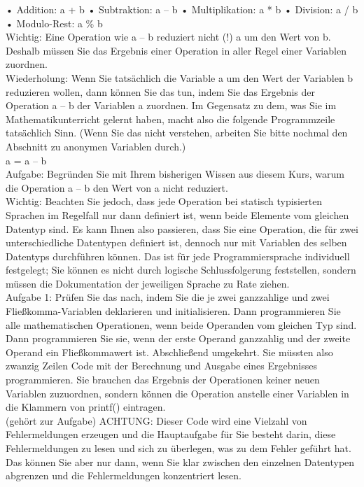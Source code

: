 •	Addition: 	a + b
•	Subtraktion:	a – b
•	Multiplikation:	a * b
•	Division:	a / b
•	Modulo-Rest:	a \% b\\

Wichtig: Eine Operation wie a – b reduziert nicht (!) a um den Wert von b. Deshalb müssen Sie das Ergebnis einer Operation in aller Regel einer Variablen zuordnen. \\

Wiederholung: Wenn Sie tatsächlich die Variable a um den Wert der Variablen b reduzieren wollen, dann können Sie das tun, indem Sie das Ergebnis der Operation a – b der Variablen a zuordnen. Im Gegensatz zu dem, was Sie im Mathematikunterricht gelernt haben, macht also die folgende Programmzeile tatsächlich Sinn. (Wenn Sie das nicht verstehen, arbeiten Sie bitte nochmal den Abschnitt zu anonymen Variablen durch.)\\

a = a – b\\

Aufgabe: Begründen Sie mit Ihrem bisherigen Wissen aus diesem Kurs, warum die Operation a – b den Wert von a nicht reduziert.\\

Wichtig: Beachten Sie jedoch, dass jede Operation bei statisch typisierten Sprachen im Regelfall nur dann definiert ist, wenn beide Elemente vom gleichen Datentyp sind. Es kann Ihnen also passieren, dass Sie eine Operation, die für zwei unterschiedliche Datentypen definiert ist, dennoch nur mit Variablen des selben Datentyps durchführen können. Das ist für jede Programmiersprache individuell festgelegt; Sie können es nicht durch logische Schlussfolgerung feststellen, sondern müssen die Dokumentation der jeweiligen Sprache zu Rate ziehen.\\

Aufgabe 1: Prüfen Sie das nach, indem Sie die je zwei ganzzahlige und zwei Fließkomma-Variablen deklarieren und initialisieren. Dann programmieren Sie alle mathematischen Operationen, wenn beide Operanden vom gleichen Typ sind. Dann programmieren Sie sie, wenn der erste Operand ganzzahlig und der zweite Operand ein Fließkommawert ist. Abschließend umgekehrt. Sie müssten also zwanzig Zeilen Code mit der Berechnung und Ausgabe eines Ergebnisses programmieren. Sie brauchen das Ergebnis der Operationen keiner neuen Variablen zuzuordnen, sondern können die Operation anstelle einer Variablen in die Klammern von printf() eintragen.\\

(gehört zur Aufgabe) ACHTUNG: Dieser Code wird eine Vielzahl von Fehlermeldungen erzeugen und die Hauptaufgabe für Sie besteht darin, diese Fehlermeldungen zu lesen und sich zu überlegen, was zu dem Fehler geführt hat. Das können Sie aber nur dann, wenn Sie klar zwischen den einzelnen Datentypen abgrenzen und die Fehlermeldungen konzentriert lesen.\\

